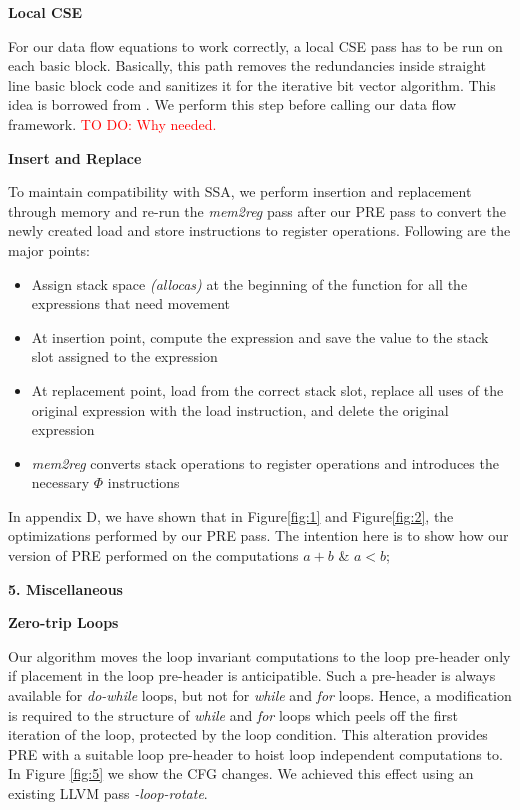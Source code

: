 \documentclass[10pt,twoside]{report}
\begin{document}
\begin{flushleft}
\textbf{\large{Local CSE}}
\end{flushleft}
For our data flow equations to work correctly, a local CSE pass has to be run
on each basic block. Basically, this path removes the redundancies inside
straight line basic block code and sanitizes it for the iterative bit vector
algorithm. This idea is borrowed from \cite{Knoop:1994:OCM:183432.183443}. We perform this step before calling
our data flow framework. 
\textcolor{red}{TO DO: Why needed.}

\begin{flushleft}
\textbf{\large{Insert and Replace}}
\end{flushleft}
To maintain compatibility with SSA, we perform insertion and replacement
  through memory and re-run the \emph{mem2reg} pass after our PRE pass to convert the
  newly created load and store instructions to register operations. Following
  are the major points:
\begin{itemize}  
  \item Assign stack space \emph{(allocas)} at the beginning of the
  function for all the expressions that need movement
  \item At insertion point,
           compute the expression and save the value to the stack slot assigned to the
             expression 
  \item At replacement point, load from the correct stack
             slot, replace all uses of the original expression with the load
             instruction, and delete the original expression
  \item \emph{mem2reg} converts stack operations to register operations and introduces the 
             necessary ${\Phi}$ instructions
\end{itemize}  

In appendix D, we have shown that in Figure\ref{fig:1}
and Figure\ref{fig:2}, the optimizations performed by our PRE pass. The intention here is to
  show how our version of PRE performed on the computations $a + b$ \& $a < b$;

\begin{flushleft}
\textbf{\Large{5. Miscellaneous}}
\end{flushleft}

\begin{flushleft}
\textbf{\large{Zero-trip Loops}}
\end{flushleft}
Our algorithm moves the loop invariant
      computations to the loop pre-header only if placement in the loop pre-header is 
      anticipatible. Such a pre-header is always available for \emph{do-while} loops, 
      but not for \emph{while} and \emph{for} loops. Hence, a modification is required
      to the structure of \emph{while} and \emph{for} loops which peels off the first
      iteration of the loop, protected by the loop condition. This alteration provides 
      PRE with a suitable loop pre-header to hoist loop independent computations to.
      In Figure \ref{fig:5} we show the CFG changes. We achieved this effect using an 
      existing LLVM pass \emph{-loop-rotate}.
\end{document}
